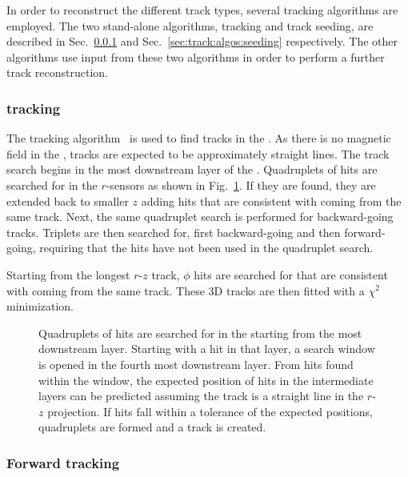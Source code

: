 In order to reconstruct the different track types, several tracking algorithms are employed. The two stand-alone algorithms, \velo tracking and track seeding, are described in Sec.~\ref{sec:track:algos:velo} and Sec.~\ref{sec:track:algos:seeding} respectively. The other algorithms use input from these two algorithms in order to perform a further track reconstruction.

\subsubsection{\velo tracking}
\label{sec:track:algos:velo}

The \velo tracking algorithm~\cite{fastvelo} is used to find tracks in the \velo. As there is no magnetic field in the \velo, tracks are expected to be approximately straight lines. The track search begins in the most downstream layer of the \velo. Quadruplets of hits are searched for in the $r$-sensors as shown in Fig.~\ref{fig:velo-tracking}. If they are found, they are extended back to smaller $z$ adding hits that are consistent with coming from the same track. Next, the same quadruplet search is performed for backward-going tracks. Triplets are then searched for, first backward-going and then forward-going, requiring that the hits have not been used in the quadruplet search.

Starting from the longest $r$-$z$ track, $\phi$ hits are searched for that are consistent with coming from the same track. These 3D tracks are then fitted with a $\chi^{2}$ minimization.

\begin{figure}[!tb]
  \centering
  
  \caption{Quadruplets of hits are searched for in the \velo starting from the most downstream layer. Starting with a hit in that layer, a search window is opened in the fourth most downstream layer. From hits found within the window, the expected position of hits in the intermediate layers can be predicted assuming the track is a straight line in the $r$-$z$ projection. If hits fall within a tolerance of the expected positions, quadruplets are formed and a track is created.}
  \label{fig:velo-tracking}
\end{figure}

\subsubsection{Forward tracking}
\label{sec:track:algos:forward}


